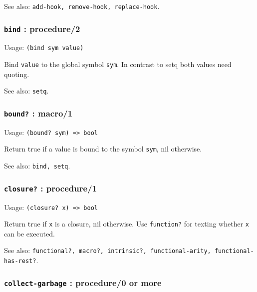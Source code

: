 \documentclass[
]{article}
\newcommand{\passthrough}[1]{#1}
\begin{document}
See also: \passthrough{\lstinline!add-hook, remove-hook, replace-hook!}.

\hypertarget{bind-procedure2}{%
\subsubsection{\texorpdfstring{\texttt{bind} :
procedure/2}{bind : procedure/2}}\label{bind-procedure2}}

Usage: \passthrough{\lstinline!(bind sym value)!}

Bind \passthrough{\lstinline!value!} to the global symbol
\passthrough{\lstinline!sym!}. In contrast to setq both values need
quoting.

See also: \passthrough{\lstinline!setq!}.

\hypertarget{bound-macro1}{%
\subsubsection{\texorpdfstring{\texttt{bound?} :
macro/1}{bound? : macro/1}}\label{bound-macro1}}

Usage: \passthrough{\lstinline!(bound? sym) => bool!}

Return true if a value is bound to the symbol
\passthrough{\lstinline!sym!}, nil otherwise.

See also: \passthrough{\lstinline!bind, setq!}.

\hypertarget{closure-procedure1}{%
\subsubsection{\texorpdfstring{\texttt{closure?} :
procedure/1}{closure? : procedure/1}}\label{closure-procedure1}}

Usage: \passthrough{\lstinline!(closure? x) => bool!}

Return true if \passthrough{\lstinline!x!} is a closure, nil otherwise.
Use \passthrough{\lstinline!function?!} for texting whether
\passthrough{\lstinline!x!} can be executed.

See also:
\passthrough{\lstinline!functional?, macro?, intrinsic?, functional-arity, functional-has-rest?!}.

\hypertarget{collect-garbage-procedure0-or-more}{%
\subsubsection{\texorpdfstring{\texttt{collect-garbage} : procedure/0 or
more}{collect-garbage : procedure/0 or more}}\label{collect-garbage-procedure0-or-more}}
\end{document}
